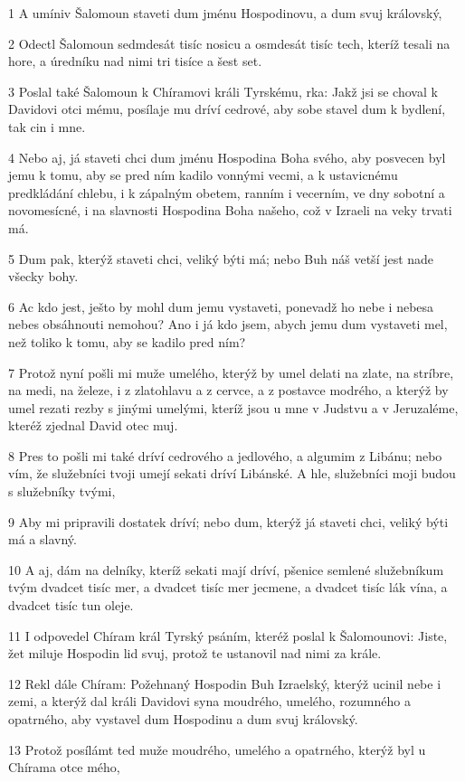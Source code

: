 \par 1 A umíniv Šalomoun staveti dum jménu Hospodinovu, a dum svuj královský,
\par 2 Odectl Šalomoun sedmdesát tisíc nosicu a osmdesát tisíc tech, kteríž tesali na hore, a úredníku nad nimi tri tisíce a šest set.
\par 3 Poslal také Šalomoun k Chíramovi králi Tyrskému, rka: Jakž jsi se choval k Davidovi otci mému, posílaje mu dríví cedrové, aby sobe stavel dum k bydlení, tak cin i mne.
\par 4 Nebo aj, já staveti chci dum jménu Hospodina Boha svého, aby posvecen byl jemu k tomu, aby se pred ním kadilo vonnými vecmi, a k ustavicnému predkládání chlebu, i k zápalným obetem, ranním i vecerním, ve dny sobotní a novomesícné, i na slavnosti Hospodina Boha našeho, což v Izraeli na veky trvati má.
\par 5 Dum pak, kterýž staveti chci, veliký býti má; nebo Buh náš vetší jest nade všecky bohy.
\par 6 Ac kdo jest, ješto by mohl dum jemu vystaveti, ponevadž ho nebe i nebesa nebes obsáhnouti nemohou? Ano i já kdo jsem, abych jemu dum vystaveti mel, než toliko k tomu, aby se kadilo pred ním?
\par 7 Protož nyní pošli mi muže umelého, kterýž by umel delati na zlate, na stríbre, na medi, na železe, i z zlatohlavu a z cervce, a z postavce modrého, a kterýž by umel rezati rezby s jinými umelými, kteríž jsou u mne v Judstvu a v Jeruzaléme, kteréž zjednal David otec muj.
\par 8 Pres to pošli mi také dríví cedrového a jedlového, a algumim z Libánu; nebo vím, že služebníci tvoji umejí sekati dríví Libánské. A hle, služebníci moji budou s služebníky tvými,
\par 9 Aby mi pripravili dostatek dríví; nebo dum, kterýž já staveti chci, veliký býti má a slavný.
\par 10 A aj, dám na delníky, kteríž sekati mají dríví, pšenice semlené služebníkum tvým dvadcet tisíc mer, a dvadcet tisíc mer jecmene, a dvadcet tisíc lák vína, a dvadcet tisíc tun oleje.
\par 11 I odpovedel Chíram král Tyrský psáním, kteréž poslal k Šalomounovi: Jiste, žet miluje Hospodin lid svuj, protož te ustanovil nad nimi za krále.
\par 12 Rekl dále Chíram: Požehnaný Hospodin Buh Izraelský, kterýž ucinil nebe i zemi, a kterýž dal králi Davidovi syna moudrého, umelého, rozumného a opatrného, aby vystavel dum Hospodinu a dum svuj královský.
\par 13 Protož posílámt ted muže moudrého, umelého a opatrného, kterýž byl u Chírama otce mého,
